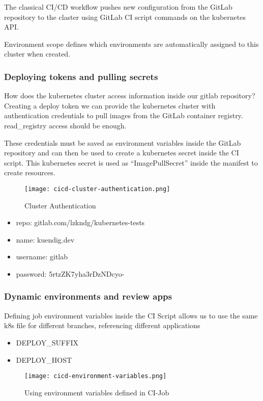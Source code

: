 The classical CI/CD workflow pushes new configuration from the GitLab repository to the claster using 
GitLab CI script commands on the kubernetes API.

Environment scope defines which environments are automatically assigned to this cluster when created.

\subsubsection{Deploying tokens and pulling secrets}
How does the kubernetes cluster access information inside our gitlab repository?
Creating a deploy token we can provide the kubernetes cluster with authentication credentials to pull images from the GitLab container registry.
read\_registry access should be enough.

These credentials must be saved as environment variables inside the 
GitLab repository and can then be used to create a kubernetes secret inside the CI script.
This kubernetes secret is used as ``ImagePullSecret'' inside the manifest to create resources.

\begin{figure}[h]
    \centering
    \texttt{[image: cicd-cluster-authentication.png]}
    \caption{Cluster Authentication}
\end{figure}

\begin{itemize}
    \item repo: gitlab.com/lzkndg/kubernetes-tests
    \item name: kuendig.dev
    \item username: gitlab
    \item password: 5rtzZK7yha3rDzNDcyo-
\end{itemize}

\subsubsection{Dynamic environments and review apps}

Defining job environment variables inside the CI Script allows us to use the same k8s file for different branches, referencing different applications
\begin{itemize}
    \item DEPLOY\_SUFFIX
    \item DEPLOY\_HOST
\end{itemize}

\begin{figure}[h]
    \centering
    \texttt{[image: cicd-environment-variables.png]}
    \caption{Using environment variables defined in CI-Job}
\end{figure}

